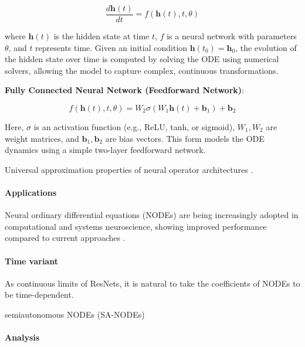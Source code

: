 \documentclass{article}
\theoremstyle{definition}
\theoremstyle{remark}
\newcounter{ct}
\begin{document}
\[
\frac{d \mathbf{h}(t)}{dt} = f(\mathbf{h}(t), t, \theta)
\]

where \( \mathbf{h}(t) \) is the hidden state at time \( t \), \( f \) is a neural network with parameters \( \theta \), and \( t \) represents time. Given an initial condition \( \mathbf{h}(t_0) = \mathbf{h}_0 \), the evolution of the hidden state over time is computed by solving the ODE using numerical solvers, allowing the model to capture complex, continuous transformations.

\textbf{Fully Connected Neural Network (Feedforward Network)}:

\[
f(\mathbf{h}(t), t, \theta) = W_2 \sigma(W_1 \mathbf{h}(t) + \mathbf{b}_1) + \mathbf{b}_2
\]

Here, \( \sigma \) is an activation function (e.g., ReLU, tanh, or sigmoid), \( W_1, W_2 \) are weight matrices, and \( \mathbf{b}_1, \mathbf{b}_2 \) are bias vectors.
 This form models the ODE dynamics using a simple two-layer feedforward network.

Universal approximation properties of neural operator architectures \citep{lu2021learning, kissas2022learning, kovachki2021universal}.


\paragraph{Applications}
Neural ordinary differential equations (NODEs) are being increasingly adopted in computational and systems neuroscience, showing improved performance compared to current approaches \citep{kim2021inferring,geenjaar2023learning,sedler2023expressive,elgazzar2024universal,rubanova2019latent,coelho2024enhancing}.



\paragraph{Time variant}
As continuous limits of ResNets, it is natural to take the coefficients of NODEs to be time-dependent.

semiautonomous NODEs (SA-NODEs) \citep{li2024universal}


\paragraph{Analysis}
\citep{massaroli2020nodes}
\end{document}
